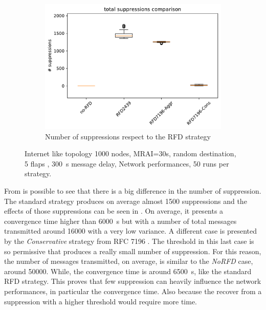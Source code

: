 \begin{figure}[h]
\begin{subfigure}[b]{0.49\textwidth}
     \end{subfigure}
     \begin{subfigure}[b]{0.49\textwidth}
         \centering
         \includegraphics[width=\textwidth]{images/RFD/miceVSelephants/mice/cisco_1000MRAI30_rfd_comparison_suppressions_boxplot.pdf}
         \caption{Number of suppressions respect to the RFD strategy}
         \label{fig:1000_RFD_MRAI30_mice_suppressions_bis}
     \end{subfigure}
		\caption{Internet like topology 1000 nodes, MRAI=30s, random destination,
		5 flaps , \SI{300}{\second} message delay, Network performances,
		\num{50} runs per strategy.}
        \label{fig:1000_RFD_MRAI30_mice_bis}
\end{figure}

From  is possible to see that
there is a big difference in the number of suppression.
The standard strategy produces on average almost \num{1500} suppressions and the effects
of those suppressions can be seen in .
On average, it presents a convergence time higher than \SI{6000}{\second}
but with a number of total messages transmitted around \num{16000} with a very
low variance.
A different case is presented by the \textit{Conservative} strategy from \ac{RFC}
7196 \cite{rfc7196}.
The threshold in this last case is so permissive that produces a really small
number of suppression.
For this reason, the number of messages transmitted, on average, is similar to
the \textit{NoRFD} case, around \num{50000}.
While, the convergence time is around \SI{6500}{\second}, like the standard \ac{RFD}
strategy.
This proves that few suppression can heavily influence the network performances,
in particular the convergence time.
Also because the recover from a suppression with a higher threshold would require
more time.


